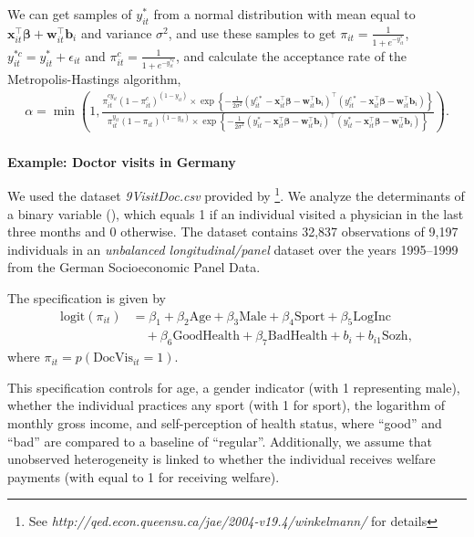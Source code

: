 We can get samples of $y_{it}^*$ from a normal distribution with mean equal to $\bm{x}_{it}^{\top}\bm{\beta}+\bm{w}_{it}^{\top}\bm{b}_i$ and variance $\sigma^2$, and use these samples to get $\pi_{it}=\frac{1}{1+e^{-y_{it}^*}}$, $y_{it}^{*c}=y_{it}^{*}+\epsilon_{it}$ and $\pi_{it}^c=\frac{1}{1+e^{-y_{it}^{*c}}}$, and calculate the acceptance rate of the Metropolis-Hastings algorithm, 
{\footnotesize
\begin{align*}
	\alpha=\min\left(1,\frac{ \pi_{it}^{cy_{it}}(1-\pi_{it}^c)^{(1-y_{it})}\times\exp\left\{-\frac{1}{2\sigma^2}(y_{it}^{c*}-\bm{x}_{it}^{\top}\bm{\beta}-\bm{w}_{it}^{\top}\bm{b}_i)^{\top}(y_{it}^{c*}-\bm{x}_{it}^{\top}\bm{\beta}-\bm{w}_{it}^{\top}\bm{b}_i)\right\}}{\pi_{it}^{y_{it}}(1-\pi_{it})^{(1-y_{it})}\times\exp\left\{-\frac{1}{2\sigma^2}(y_{it}^{*}-\bm{x}_{it}^{\top}\bm{\beta}-\bm{w}_{it}^{\top}\bm{b}_i)^{\top}(y_{it}^{*}-\bm{x}_{it}^{\top}\bm{\beta}-\bm{w}_{it}^{\top}\bm{b}_i)\right\}}\right).
\end{align*}
}\\

\textbf{Example: Doctor visits in Germany}

We used the dataset \textit{9VisitDoc.csv} provided by \cite{Winkelmann2004}\footnote{See \textit{http://qed.econ.queensu.ca/jae/2004-v19.4/winkelmann/} for details}. We analyze the determinants of a binary variable (), which equals 1 if an individual visited a physician in the last three months and 0 otherwise. The dataset contains 32,837 observations of 9,197 individuals in an \textit{unbalanced longitudinal/panel} dataset over the years 1995--1999 from the German Socioeconomic Panel Data.

The specification is given by
\begin{align*}
	\text{logit}(\pi_{it}) &= \beta_1 + \beta_2 \text{Age} + \beta_3 \text{Male} + \beta_4 \text{Sport} + \beta_5 \text{LogInc} \\
	&\quad + \beta_6 \text{GoodHealth} + \beta_7 \text{BadHealth} + b_i + b_{i1} \text{Sozh},
\end{align*}
where $\pi_{it} = p(\text{DocVis}_{it} = 1)$.

This specification controls for age, a gender indicator (with 1 representing male), whether the individual practices any sport (with 1 for sport), the logarithm of monthly gross income, and self-perception of health status, where “good” and “bad” are compared to a baseline of “regular”. Additionally, we assume that unobserved heterogeneity is linked to whether the individual receives welfare payments (with  equal to 1 for receiving welfare). 

